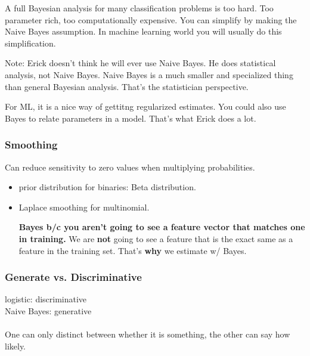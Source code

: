 A full Bayesian analysis for many classification problems is too hard.  Too parameter rich, too computationally expensive.
You can simplify by making the Naive Bayes assumption. 
In machine learning world you will usually do this simplification. 

Note: Erick doesn't think he will ever use Naive Bayes.  
He does statistical analysis, not Naive Bayes.  
Naive Bayes is a much smaller and specialized thing than general Bayesian analysis.
That's the statistician perspective. 

For ML, it is a nice way of gettitng regularized estimates. 
You could also use Bayes to relate parameters in a model. 
That's what Erick does a lot. 

\subsubsection{Smoothing}
Can reduce sensitivity to zero values when multiplying probabilities.
\begin{itemize}
	\item prior distribution for binaries: Beta distribution. 
	\item Laplace smoothing for multinomial. 
	
\textbf{Bayes b/c you aren't going to see a feature vector that matches one in training.}
	We are \textbf{not} going to see a feature that is the exact same as a feature in the training set. 
	That's \textbf{why} we estimate w/ Bayes.   %
\end{itemize}

\subsubsection{Generate vs. Discriminative}
logistic: discriminative  \hfill \\
Naive Bayes:  generative   \hfill \\
\hfill \\

One can only distinct between whether it is something, the other can say how likely. \hfill \\



